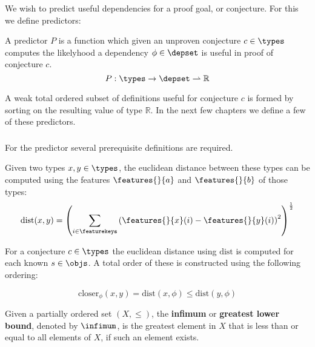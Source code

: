 We wish to predict useful dependencies for a proof goal, or conjecture.
For this we define predictors:

\begin{definition}
  A predictor $P$ is a function which given an unproven conjecture $c \in \types$
  computes the likelyhood a dependency $\phi \in \depset$ is useful in proof of conjecture $c$.
  $$
    P : \types \rightarrow \depset \rightharpoonup \mathbb{R}
  $$
\end{definition}

A weak total ordered subset of definitions useful for conjecture $c$ is formed by sorting on the resulting value of type $\mathbb{R}$.
In the next few chapters we define a few of these predictors.

\subsubsection{\knn}


For the \knn predictor several prerequisite definitions are required.

\begin{definition}\label{def:dist}
  Given two types $x, y \in \types$, the euclidean distance between these types can be computed using the features $\features{}{a}$ and $\features{}{b}$ of those types:
  $$ \text{dist}(x, y) = \left( \sum_{i \in \featurekeys} \left( \features{}{x}(i) - \features{}{y}(i) \right)^2 \right)^{\frac{1}{2}} $$
\end{definition}

For a conjecture $c \in \types$ the euclidean distance using $\text{dist}$ is computed for each known \coqobj $s \in \objs$.
A total order of these \coqobjs is constructed using the following ordering:

\begin{definition}
  $$
    \text{closer}_\phi(x, y) = \text{dist}(x, \phi) \leq \text{dist}(y, \phi)
  $$
\end{definition}

\begin{definition}\label{def:infimum}
  Given a partially ordered set $(X, \leq)$,
  the \textbf{infimum} or \textbf{greatest lower bound}, denoted by $\infimum$, is the greatest element in $X$ that is less than or equal to all elements of $X$,
  if such an element exists.
\end{definition}

